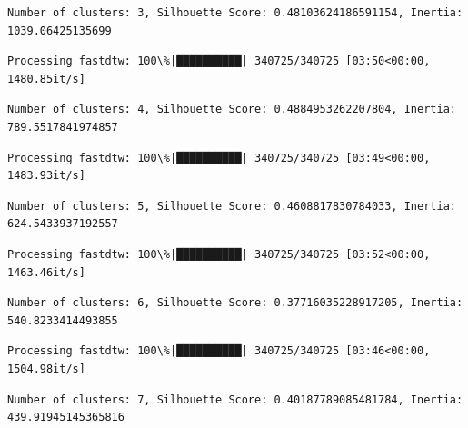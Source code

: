 \documentclass[11pt]{article}
\begin{document}
    \begin{Verbatim}[commandchars=\\\{\}]
Number of clusters: 3, Silhouette Score: 0.48103624186591154, Inertia:
1039.06425135699
    \end{Verbatim}

    \begin{Verbatim}[commandchars=\\\{\}]
Processing fastdtw: 100\%|██████████| 340725/340725 [03:50<00:00, 1480.85it/s]
    \end{Verbatim}

    \begin{Verbatim}[commandchars=\\\{\}]
Number of clusters: 4, Silhouette Score: 0.4884953262207804, Inertia:
789.5517841974857
    \end{Verbatim}

    \begin{Verbatim}[commandchars=\\\{\}]
Processing fastdtw: 100\%|██████████| 340725/340725 [03:49<00:00, 1483.93it/s]
    \end{Verbatim}

    \begin{Verbatim}[commandchars=\\\{\}]
Number of clusters: 5, Silhouette Score: 0.4608817830784033, Inertia:
624.5433937192557
    \end{Verbatim}

    \begin{Verbatim}[commandchars=\\\{\}]
Processing fastdtw: 100\%|██████████| 340725/340725 [03:52<00:00, 1463.46it/s]
    \end{Verbatim}

    \begin{Verbatim}[commandchars=\\\{\}]
Number of clusters: 6, Silhouette Score: 0.37716035228917205, Inertia:
540.8233414493855
    \end{Verbatim}

    \begin{Verbatim}[commandchars=\\\{\}]
Processing fastdtw: 100\%|██████████| 340725/340725 [03:46<00:00, 1504.98it/s]
    \end{Verbatim}

    \begin{Verbatim}[commandchars=\\\{\}]
Number of clusters: 7, Silhouette Score: 0.40187789085481784, Inertia:
439.91945145365816
    \end{Verbatim}
\end{document}
